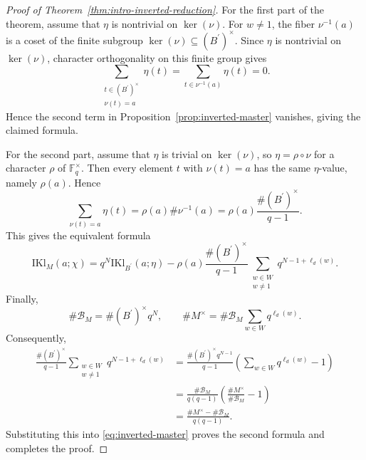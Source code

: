 \documentclass[11pt]{amsart}
\renewcommand{\subset}{\subseteq}
\newcommand{\IKl}{\mathrm{IKl}}
\numberwithin{equation}{section}
\theoremstyle{remark}
\theoremstyle{plain}
\theoremstyle{definition}
\begin{document}
\begin{proof}[Proof of Theorem~\ref{thm:intro-inverted-reduction}]
For the first part of the theorem, assume that \(\eta\) is nontrivial
on \(\ker(\nu)\).  For \(w\neq 1\), the fiber \(\nu^{-1}(a)\) is a
coset of the finite subgroup \(\ker(\nu)\subset (B^{\prime})^\times\).
Since \(\eta\) is nontrivial on \(\ker(\nu)\), character orthogonality
on this finite group gives
\[
\sum_{\substack{t\in (B^{\prime})^\times\\ \nu(t)=a}}\eta(t)
=
\sum_{t\in \nu^{-1}(a)}\eta(t)
=
0.
\]
Hence the second term in Proposition~\ref{prop:inverted-master}
vanishes, giving the claimed formula.

For the second part, assume that \(\eta\) is trivial on \(\ker(\nu)\), so
\(\eta=\rho\circ\nu\) for a character
\(\rho\) of \(\mathbb{F}_q^\times\).  Then every element \(t\) with
\(\nu(t)=a\) has the same \(\eta\)-value, namely \(\rho(a)\).  Hence
\[
\sum_{\nu(t)=a}\eta(t)
=
\rho(a)\#\nu^{-1}(a)
=
\rho(a)\frac{\#(B^{\prime})^\times}{q-1}.
\]
This gives the equivalent formula
\[
\IKl_M(a;\chi)
=
q^N\IKl_{B^{\prime}}(a;\eta)
-
\rho(a)\frac{\#(B^{\prime})^\times}{q-1}
\sum_{\substack{w\in W\\w\neq 1}}q^{N-1+\ell_d(w)}.
\]
Finally,
\[
\#\mathcal{B}_M=\#(B^{\prime})^\times q^N,
\qquad
\#M^\times=\#\mathcal{B}_M\sum_{w\in W}q^{\ell_d(w)}.
\]
Consequently,
\begin{align*}
  \frac{\#(B^{\prime})^\times}{q-1}
  \sum_{\substack{w\in W\\ w\neq 1}}q^{N-1+\ell_d(w)}
  &=
    \frac{\#(B^{\prime})^\times q^{N-1}}{q-1}
    \left(\sum_{w\in W}q^{\ell_d(w)}-1\right) \\
  &=
    \frac{\#\mathcal{B}_M}{q(q-1)}
    \left(\frac{\#M^\times}{\#\mathcal{B}_M}-1\right) \\
  &=
    \frac{\#M^\times-\#\mathcal{B}_M}{q(q-1)}.
\end{align*}
Substituting this into \eqref{eq:inverted-master} proves the second
formula and completes the proof.
\end{proof}
\end{document}
